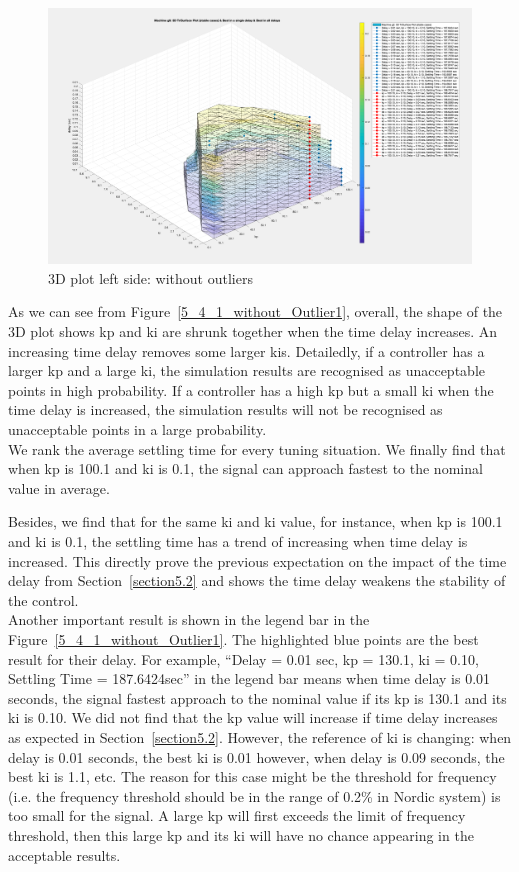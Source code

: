 \begin{figure}[htbp]
\centering
\includegraphics[width = .819\textwidth]{figure/5_4_1_without_Outlier4.png}
\caption{3D plot left side: without outliers}
\label{5_4_1_without_Outlier4}
\end{figure}


As we can see from Figure~\ref{5_4_1_without_Outlier1}, overall, the shape of the 3D plot shows kp and ki are shrunk together when the time delay increases. An increasing time delay removes some larger kis. Detailedly, if a controller has a larger kp and a large ki, the simulation results are recognised as unacceptable points in high probability. If a controller has a high kp but a small ki when the time delay is increased, the simulation results will not be recognised as unacceptable points in a large probability.\\

We rank the average settling time for every tuning situation. We finally find that when kp is 100.1 and ki is 0.1, the signal can approach fastest to the nominal value in average. 

Besides, we find that for the same ki and ki value, for instance, when kp is 100.1 and ki is 0.1, the settling time has a trend of increasing when time delay is increased. This directly prove the previous expectation on the impact of the time delay from Section~\ref{section5.2} and shows the time delay weakens the stability of the control.\\


Another important result is shown in the legend bar in the Figure~\ref{5_4_1_without_Outlier1}. The highlighted blue points are the best result for their delay. For example, “Delay = 0.01 sec, kp = 130.1, ki = 0.10, Settling Time = 187.6424sec” in the legend bar means when time delay is 0.01 seconds, the signal fastest approach to the nominal value if its kp is 130.1 and its ki is 0.10. We did not find that the kp value will increase if time delay increases as expected in Section~\ref{section5.2}. However, the reference of ki is changing: when delay is 0.01 seconds, the best ki is 0.01 however, when delay is 0.09 seconds, the best ki is 1.1, etc. The reason for this case might be the threshold for frequency (i.e. the frequency threshold should be in the range of 0.2\% in Nordic system) is too small for the signal. A large kp will first exceeds the limit of frequency threshold, then this large kp and its ki will have no chance appearing in the acceptable results.\\

